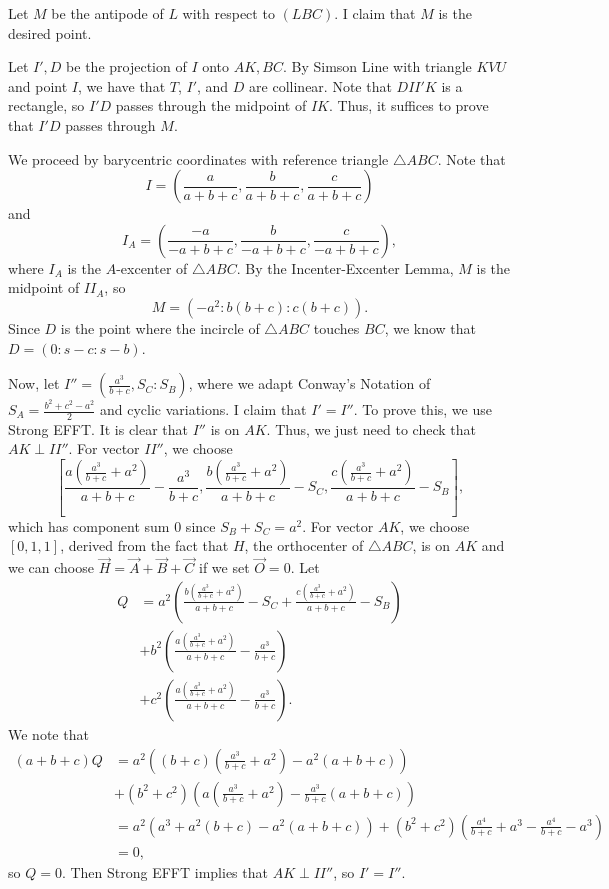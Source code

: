 Let $M$ be the antipode of $L$ with respect to $\left(LBC\right)$. I claim that $M$ is the desired point.

Let $I',D$ be the projection of $I$ onto $AK,BC$. By Simson Line with triangle $KVU$ and point $I$, we have that $T$, $I'$, and $D$ are collinear. Note that $DII'K$ is a rectangle, so $I'D$ passes through the midpoint of $IK$. Thus, it suffices to prove that $I'D$ passes through $M$.

We proceed by barycentric coordinates with reference triangle $\triangle{ABC}$. Note that \[I=\left(\frac{a}{a+b+c},\frac{b}{a+b+c},\frac{c}{a+b+c}\right)\] and \[I_A=\left(\frac{-a}{-a+b+c},\frac{b}{-a+b+c},\frac{c}{-a+b+c}\right),\] where $I_A$ is the $A$-excenter of $\triangle{ABC}$. By the Incenter-Excenter Lemma, $M$ is the midpoint of $II_A$, so \[M=\left(-a^2:b\left(b+c\right):c\left(b+c\right)\right).\] Since $D$ is the point where the incircle of $\triangle{ABC}$ touches $BC$, we know that $D=\left(0:s-c:s-b\right)$.

Now, let $I''=\left(\frac{a^3}{b+c},S_C:S_B\right)$, where we adapt Conway's Notation of $S_A=\frac{b^2+c^2-a^2}{2}$ and cyclic variations. I claim that $I'=I''$. To prove this, we use Strong EFFT. It is clear that $I''$ is on $AK$. Thus, we just need to check that $AK\perp II''$. For vector $II''$, we choose \[\left[\frac{a\left(\frac{a^3}{b+c}+a^2\right)}{a+b+c}-\frac{a^3}{b+c},\frac{b\left(\frac{a^3}{b+c}+a^2\right)}{a+b+c}-S_C,\frac{c\left(\frac{a^3}{b+c}+a^2\right)}{a+b+c}-S_B\right],\] which has component sum $0$ since $S_B+S_C=a^2$. For vector $AK$, we choose $\left[0,1,1\right]$, derived from the fact that $H$, the orthocenter of $\triangle{ABC}$, is on $AK$ and we can choose $\overrightarrow{H}=\overrightarrow{A}+\overrightarrow{B}+\overrightarrow{C}$ if we set $\overrightarrow{O}=0$. Let
\begin{align*}
	Q&=a^2\left(\frac{b\left(\frac{a^3}{b+c}+a^2\right)}{a+b+c}-S_C+\frac{c\left(\frac{a^3}{b+c}+a^2\right)}{a+b+c}-S_B\right)\\
	&+b^2\left(\frac{a\left(\frac{a^3}{b+c}+a^2\right)}{a+b+c}-\frac{a^3}{b+c}\right)\\
	&+c^2\left(\frac{a\left(\frac{a^3}{b+c}+a^2\right)}{a+b+c}-\frac{a^3}{b+c}\right).
\end{align*}
We note that
\begin{align*}
	\left(a+b+c\right)Q&=a^2\left(\left(b+c\right)\left(\frac{a^3}{b+c}+a^2\right)-a^2\left(a+b+c\right)\right)\\
	&+\left(b^2+c^2\right)\left(a\left(\frac{a^3}{b+c}+a^2\right)-\frac{a^3}{b+c}\left(a+b+c\right)\right)\\
	&=a^2\left(a^3+a^2\left(b+c\right)-a^2\left(a+b+c\right)\right)+\left(b^2+c^2\right)\left(\frac{a^4}{b+c}+a^3-\frac{a^4}{b+c}-a^3\right)\\
	&=0,
\end{align*}
so $Q=0$. Then Strong EFFT implies that $AK\perp II''$, so $I'=I''$.

